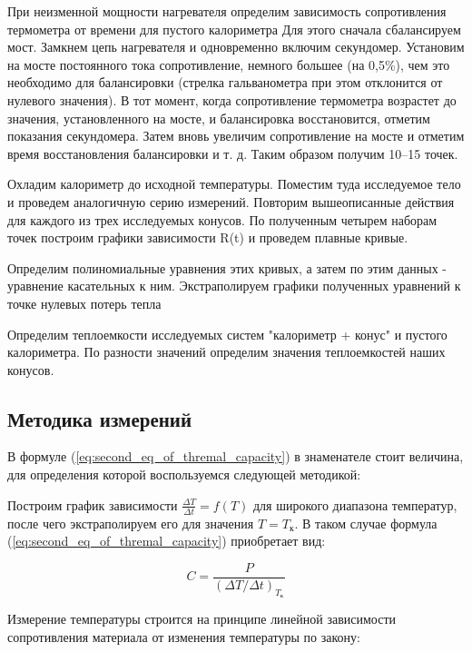 \documentclass[12pt,a4paper]{article}
\begin{document}
 При неизменной мощности нагревателя определим зависимость сопротивления термометра от времени для пустого калориметра
Для этого сначала сбалансируем мост. Замкнем цепь нагревателя и одновременно включим секундомер. Установим на мосте постоянного тока сопротивление, немного большее (на
0,5\%), чем это необходимо для балансировки (стрелка гальванометра при этом отклонится от нулевого значения).
В тот момент, когда сопротивление термометра возрастет до значения, установленного на мосте, и балансировка восстановится, отметим показания секундомера. Затем вновь увеличим сопротивление на мосте и отметим время восстановления балансировки и т. д. Таким образом получим 10–15 точек. 

Охладим калориметр до исходной температуры. Поместим туда исследуемое тело и проведем аналогичную серию измерений. Повторим вышеописанные действия для каждого из трех исследуемых конусов. По полученным четырем наборам точек построим графики зависимости R(t) и проведем плавные кривые.

Определим полиномиальные уравнения этих кривых, а затем по этим данных - уравнение касательных к ним. Экстраполируем графики полученных уравнений к точке нулевых потерь тепла

Определим теплоемкости исследуемых систем "калориметр + конус" и пустого калориметра. По разности значений определим значения теплоемкостей наших конусов.

\subsection{Методика измерений}


	В формуле (\ref{eq:second_eq_of_thremal_capacity}) в знаменателе стоит величина, для определения которой воспользуемся следующей методикой:
	
	Построим график зависимости $\frac{\Delta T}{\Delta t} = f \left( T \right)$ для широкого диапазона температур, после чего экстраполируем его для значения $T = T_{\text{к}}$. В таком случае формула (\ref{eq:second_eq_of_thremal_capacity}) приобретает вид:
	
	\begin{equation}
		C = \frac{P}{\left( \Delta T / \Delta t \right)_{T_{\text{к}}}}
		\label{eq:final_eq_for_capacity}
	\end{equation}
	
	Измерение температуры строится на принципе линейной зависимости сопротивления материала от изменения температуры по закону:
	
\end{document}
